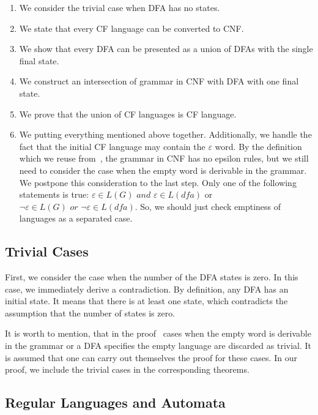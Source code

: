 \documentclass[runningheads]{llncs}
\begin{document}
\begin{enumerate}
    \item We consider the trivial case when DFA has no states.
    \item We state that every CF language can be converted to CNF.
    \item We show that every DFA can be presented as a union of DFAs with the single final state.
    \item We construct an intersection of grammar in CNF with DFA with one final state.
    \item We prove that the union of CF languages is CF language.
    \item We putting everything mentioned above together.
	Additionally, we handle the fact that the initial CF language may contain the $\varepsilon$ word. By the definition which we reuse from~\cite{smolkaHofmann2016}, the grammar in CNF has no epsilon rules, but we still need to consider the case when the empty word is derivable in the grammar. We postpone this consideration to the last step. Only one of the following statements is true: $\varepsilon \in L(G) \textit{ and } \varepsilon \in L(\textit{dfa})$ or $\neg \varepsilon \in L(G) \textit{ or } \neg \varepsilon \in L(\textit{dfa})$. So, we should just check emptiness of languages as a separated case.

\end{enumerate}


\subsection{Trivial Cases}

First, we consider the case when the number of the DFA states is zero.
In this case, we immediately derive a contradiction.
By definition, any DFA has an initial state.
It means that there is at least one state, which contradicts the assumption that the number of states is zero.

It is worth to mention, that in the proof~\cite{beigelproof} cases when the empty word is derivable in the grammar or a DFA specifies the empty language are discarded as trivial.
It is assumed that one can carry out themselves the proof for these cases.
In our proof, we include the trivial cases in the corresponding theorems.

\subsection{Regular Languages and Automata}
\end{document}
